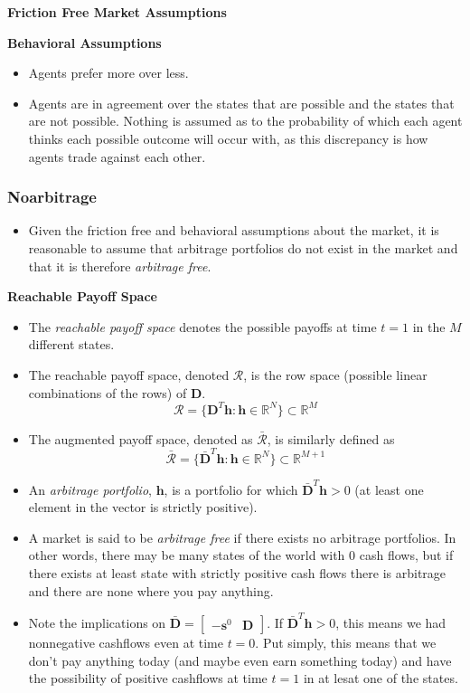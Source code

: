 \documentclass[11pt]{article}
\begin{document}
\textbf{Friction Free Market Assumptions}

\textbf{Behavioral Assumptions}
\begin{itemize}
    \item Agents prefer more over less. 
    \item Agents are in agreement over the states that are possible and the states that are not 
    possible. Nothing is assumed as to the probability of which each agent thinks each possible 
    outcome will occur with, as this discrepancy is how agents trade against each other.
\end{itemize}

\subsubsection{Noarbitrage}

\begin{itemize}
    \item Given the friction free and behavioral assumptions about the market, it is reasonable 
    to assume that arbitrage portfolios do not exist in the market and that it is therefore 
    \textit{arbitrage free}.
\end{itemize}

\textbf{Reachable Payoff Space}
\begin{itemize}
    \item The \textit{reachable payoff space} denotes the possible payoffs at time $t=1$ in the 
    $M$ different states. 
    \item The reachable payoff space, denoted $\mathcal{R}$, is the row space (possible linear 
    combinations of the rows) of $\boldsymbol{D}$.
    \[\mathcal{R} = \{\boldsymbol{D}^T \boldsymbol{h}: \boldsymbol{h} \in \mathbb{R}^N\} 
    \subset \mathbb{R}^M\]
    \item The augmented payoff space, denoted as $\mathcal{\bar{R}}$, is similarly defined as
    \[\mathcal{\bar{R}} = \{\boldsymbol{\bar{D}}^T \boldsymbol{h}: \boldsymbol{h} \in 
    \mathbb{R}^N\} \subset \mathbb{R}^{M+1}\]
    \item An \textit{arbitrage portfolio}, $\boldsymbol{h}$, is a portfolio for which 
    $\boldsymbol{\bar{D}}^T \boldsymbol{h} > 0$ (at least one element in the vector is strictly 
    positive). 
    \item A market is said to be \textit{arbitrage free} if there exists no arbitrage 
    portfolios. In other words, there may be many states of the world with 0 cash flows, but if
    there exists at least state with strictly positive cash flows there is arbitrage and there 
    are none where you pay anything. 
    \item Note the implications on $\bar{\boldsymbol{D}} = \begin{bmatrix} -\boldsymbol{s}^0 & 
    \boldsymbol{D} \end{bmatrix}$. If $\boldsymbol{\bar{D}}^T \boldsymbol{h} > 0$, this means we 
    had nonnegative cashflows even at time $t=0$. Put simply, this means that we don't pay 
    anything today (and maybe even earn something today) and have the possibility of positive 
    cashflows at time $t=1$ in at lesat one of the states. 
\end{itemize}
\end{document}

